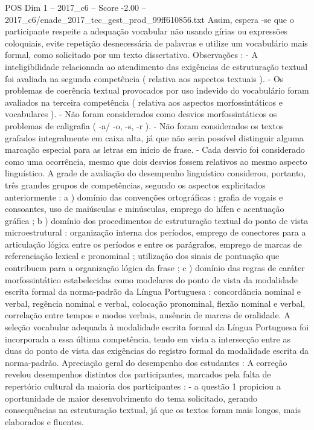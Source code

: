 \begin{textsample}{POS Dim 1 – 2017\_c6 – Score -2.00 – 2017\_c6/enade\_2017\_tec\_gest\_prod\_99ff610856.txt}
Assim, espera -se que o participante respeite a adequação vocabular não usando gírias ou expressões coloquiais, evite repetição desnecessária de palavras e utilize um vocabulário mais formal, como solicitado por um texto dissertativo.
Observações : - A inteligibilidade relacionada ao atendimento das exigências de estruturação textual foi avaliada na segunda competência ( relativa aos aspectos textuais ). - Os problemas de coerência textual provocados por uso indevido do vocabulário foram avaliados na terceira competência ( relativa aos aspectos morfossintáticos e vocabulares ). - Não foram considerados como desvios morfossintáticos os problemas de caligrafia ( -a/ -o, -s, -r ). - Não foram considerados os textos grafados integralmente em caixa alta, já que não seria possível distinguir alguma marcação especial para as letras em início de frase. - Cada desvio foi considerado como uma ocorrência, mesmo que dois desvios fossem relativos ao mesmo aspecto linguístico.
A grade de avaliação do desempenho linguístico considerou, portanto, três grandes grupos de competências, segundo os aspectos explicitados anteriormente : a ) domínio das convenções ortográficas : grafia de vogais e consoantes, uso de maiúsculas e minúsculas, emprego do hífen e acentuação gráfica ; b ) domínio dos procedimentos de estruturação textual do ponto de vista microestrutural : organização interna dos períodos, emprego de conectores para a articulação lógica entre os períodos e entre os parágrafos, emprego de marcas de referenciação lexical e pronominal ; utilização dos sinais de pontuação que contribuem para a organização lógica da frase ; c ) domínio das regras de caráter morfossintático estabelecidas como modelares do ponto de vista da modalidade escrita formal da norma-padrão da Língua Portuguesa : concordância nominal e verbal, regência nominal e verbal, colocação pronominal, flexão nominal e verbal, correlação entre tempos e modos verbais, ausência de marcas de oralidade.
A seleção vocabular adequada à modalidade escrita formal da Língua Portuguesa foi incorporada a essa última competência, tendo em vista a intersecção entre as duas do ponto de vista das exigências do registro formal da modalidade escrita da norma-padrão.
Apreciação geral do desempenho dos estudantes : A correção revelou desempenhos distintos dos participantes, marcados pela falta de repertório cultural da maioria dos participantes : - a questão 1 propiciou a oportunidade de maior desenvolvimento do tema solicitado, gerando consequências na estruturação textual, já que os textos foram mais longos, mais elaborados e fluentes.

\end{textsample}
